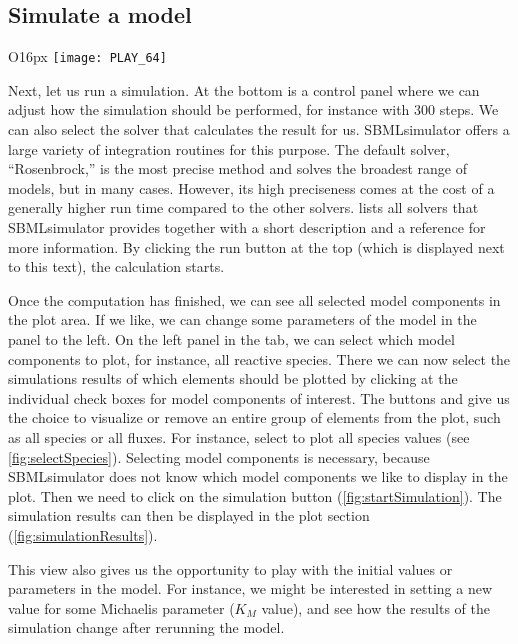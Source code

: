 \subsection{Simulate a model}
\begin{wrapfigure}{O}{16px}
\vspace{\wrapfigspace}
\texttt{[image: PLAY\_64]}
\end{wrapfigure}
Next, let us run a simulation.
At the bottom is a control panel where we can adjust how the simulation should be performed, for instance with 300 steps.
We can also select the solver that calculates the result for us.
SBMLsimulator offers a large variety of integration routines for this purpose.
The default solver, ``Rosenbrock,'' is the most precise method and solves the broadest range of models, but in many cases.
However, its high preciseness comes at the cost of a generally higher run time compared to the other solvers.
 lists all solvers that SBMLsimulator provides together with a short description and a reference for more information.
By clicking the run button at the top (which is displayed next to this text), the calculation starts.

Once the computation has finished, we can see all selected model components in the plot area.
If we like, we can change some parameters of the model in the panel to the left.
On the left panel in the  tab, we can select which model components to plot, for instance, all reactive species.
There we can now select the simulations results of which elements should be plotted by clicking at the individual check boxes for model components of interest.
The buttons  and  give us the choice to visualize or remove an entire group of elements from the plot, such as all species or all fluxes.
For instance, select to plot all species values (see \cref{fig:selectSpecies}).
Selecting model components is necessary, because SBMLsimulator does not know which model components we like to display in the plot.
Then we need to click on the simulation button (\cref{fig:startSimulation}).
The simulation results can then be displayed in the plot section (\cref{fig:simulationResults}).

This view also gives us the opportunity to play with the initial values or parameters in the model.
For instance, we might be interested in setting a new value for some Michaelis parameter ($K_M$ value), and see how the results of the simulation change after rerunning the model.

